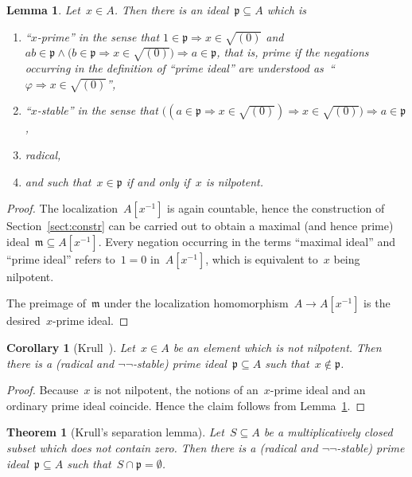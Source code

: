 \documentclass[com,11pt,crcready]{iosart2x}
\theoremstyle{definition}
\theoremstyle{plain}
\newtheorem{corollary}[definition]{Corollary}
\newtheorem{lemma}[definition]{Lemma}
\newtheorem{theorem}[definition]{Theorem}
\theoremstyle{remark}
\newcommand{\?}{\,{:}\,}
\newcommand{\mmm}{\mathfrak{m}}
\newcommand{\ppp}{\mathfrak{p}}
\renewcommand{\_}{\mathpunct{.}\,}
\begin{document}
\begin{lemma}\label{lemma:x-prime}
Let~$x \in A$. Then there is an ideal~$\ppp \subseteq A$ which is
\begin{enumerate}
\item ``$x$-prime'' in the sense that
$1 \in \ppp \Rightarrow x \in \sqrt{(0)}$ and
$ab \in \ppp \wedge \bigl(b \in \ppp \Rightarrow x \in \sqrt{(0)}\bigr) \Longrightarrow
   a \in \ppp$,
that is, prime if the negations occurring in the definition of ``prime ideal''
are understood as~``$\varphi \Rightarrow x \in \sqrt{(0)}$'',
\item ``$x$-stable'' in the sense that
$\bigl((a \in \ppp \Rightarrow x \in \sqrt{(0)}) \Rightarrow x \in \sqrt{(0)}\bigr)
  \Rightarrow a \in \ppp$,
\item radical,
\item and such that~$x \in \ppp$ if and only if~$x$ is nilpotent.
\end{enumerate}
\end{lemma}

\begin{proof}The localization~$A[x^{-1}]$ is again countable, hence the
construction of Section~\ref{sect:constr} can be carried out to obtain a
maximal (and hence prime) ideal~$\mmm \subseteq A[x^{-1}]$. Every negation
occurring in the terms ``maximal ideal'' and ``prime ideal'' refers to~$1 = 0$
in~$A[x^{-1}]$, which is equivalent to~$x$ being nilpotent.

The preimage of~$\mmm$ under the localization homomorphism~$A \to A[x^{-1}]$ is
the desired~$x$-prime ideal.
\end{proof}

\begin{corollary}[Krull~\cite{krull:ohne}]\label{cor:nilp-prime}Let~$x \in A$ be an element which is not nilpotent. Then there is a
(radical and $\neg\neg$-stable) prime ideal~$\ppp \subseteq A$ such that~$x \not\in \ppp$.
\end{corollary}

\begin{proof}Because~$x$ is not nilpotent, the notions of an~$x$-prime ideal and
an ordinary prime ideal coincide. Hence the claim follows from
Lemma~\ref{lemma:x-prime}.\end{proof}

\begin{theorem}[Krull's separation lemma]Let~$S \subseteq A$ be a multiplicatively closed subset which
does not contain zero. Then there is a
(radical and $\neg\neg$-stable) prime ideal~$\ppp \subseteq A$ such that~$S
\cap \ppp = \emptyset$.
\end{theorem}
\end{document}
